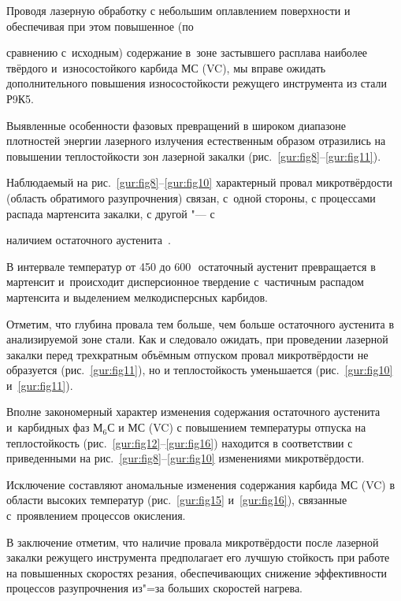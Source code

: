 Проводя лазерную обработку с небольшим оплавлением поверхности и обеспечивая при этом повышенное (по

сравнению с~исходным) содержание в~зоне застывшего расплава наиболее твёрдого и~износостойкого карбида МС (VC), мы вправе ожидать дополнительного повышения износостойкости режущего инструмента из стали Р9К5.



Выявленные особенности фазовых превращений в широком диапазоне плотностей энергии лазерного излучения естественным образом отразились на повышении теплостойкости зон лазерной закалки (рис.~\ref{gur:fig8}--\ref{gur:fig11}). 

Наблюдаемый на рис.~\ref{gur:fig8}--\ref{gur:fig10} характерный провал микротвёрдости (область обратимого разупрочнения) связан, с~одной стороны, с процессами распада мартенсита закалки, с другой "--- с

наличием остаточного аустенита~\cite{gureev:bib5,gureev:bib6}. 

В интервале температур от 450 до 600\,\textcelsius\ остаточный аустенит превращается в мартенсит и~происходит дисперсионное твердение с~частичным распадом мартенсита и выделением мелкодисперсных карбидов. 

Отметим, что глубина провала тем больше, чем больше остаточного аустенита в анализируемой зоне стали. Как и следовало ожидать, при проведении лазерной закалки перед трехкратным объёмным отпуском провал микротвёрдости не образуется (рис.~\ref{gur:fig11}), но и теплостойкость уменьшается (рис.~\ref{gur:fig10} и~\ref{gur:fig11}).



Вполне закономерный характер изменения содержания остаточного аустенита и~карбидных фаз М$_6$С и МС (VC) с повышением температуры отпуска на теплостойкость (рис.~\ref{gur:fig12}--\ref{gur:fig16}) находится в соответствии с приведенными на рис.~\ref{gur:fig8}--\ref{gur:fig10} изменениями микротвёрдости.

Исключение составляют аномальные изменения содержания карбида МС (VC) в области высоких температур (рис.~\ref{gur:fig15} и~\ref{gur:fig16}), связанные с~проявлением процессов окисления.





В заключение отметим, что наличие провала микротвёрдости после лазерной закалки режущего инструмента предполагает его лучшую стойкость при работе на повышенных скоростях резания, обеспечивающих снижение эффективности процессов разупрочнения из"=за больших скоростей нагрева.



